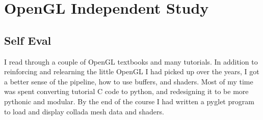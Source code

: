 \section{OpenGL Independent Study}

\begin{meta}
\end{meta}


\subsection*{Self Eval}
I read through a couple of OpenGL textbooks and many tutorials. In
addition to reinforcing and relearning the little OpenGL I had picked
up over the years, I got a better sense of the pipeline, how to use
buffers, and shaders. Most of my time was spent converting tutorial C
code to python, and redesigning it to be more pythonic and modular. By
the end of the course I had written a pyglet program to load and display
collada mesh data and shaders.

\vspace{2cm}
